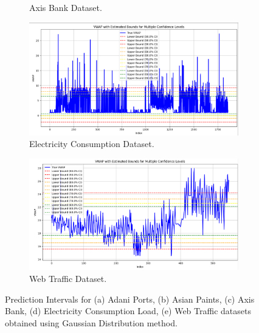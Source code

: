 \begin{figure}[H]
\begin{minipage}{0.6\textwidth}
\begin{subfigure}[b]{0.8\textwidth}
                \caption{Axis Bank Dataset.}
            \end{subfigure}
            \begin{subfigure}[b]{0.8\textwidth}
                \centering
                \includegraphics[width=\textwidth]{Chap02/figs/Gaussian_Electricity_Consumption.png}
                \caption{Electricity Consumption Dataset.}
            \end{subfigure}

            \begin{subfigure}[b]{0.8\textwidth}
                \centering
                \includegraphics[width=\textwidth]{Chap02/figs/Gaussian_Web_Traffic.png}
                \caption{Web Traffic Dataset.}
            \end{subfigure}
        \end{minipage}
    
    \caption{Prediction Intervals for (a) Adani Ports, (b) Asian Paints, (c) Axis Bank, (d) Electricity Consumption Load, (e) Web Traffic datasets obtained using Gaussian Distribution method.}
    \label{Fi 3.6}
\end{figure}


